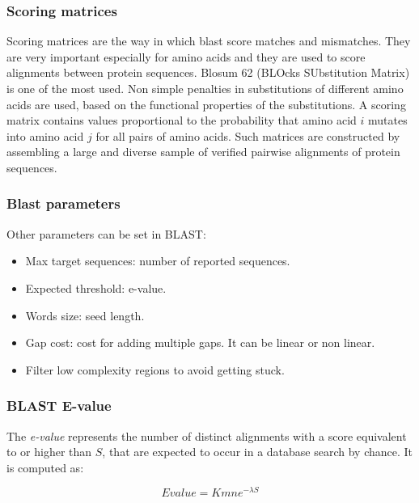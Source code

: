         \subsubsection{Scoring matrices}
        Scoring matrices are the way in which blast score matches and mismatches.
        They are very important especially for amino acids and they are used to score alignments between protein sequences.
        Blosum 62 (BLOcks SUbstitution Matrix) is one of the most used.
        Non simple penalties in substitutions of different amino acids are used, based on the functional properties of the substitutions.
        A scoring matrix contains values proportional to the probability that amino acid $i$ mutates into amino acid $j$ for all pairs of amino acids.
        Such matrices are constructed by assembling a large and diverse sample of verified pairwise alignments of protein sequences.

        \subsubsection{Blast parameters}
        Other parameters can be set in BLAST:

        \begin{multicols}{2}
            \begin{itemize}
                \item Max target sequences: number of reported sequences.
                \item Expected threshold: e-value.
                \item Words size: seed length.
                \item Gap cost: cost for adding multiple gaps.
                    It can be linear or non linear.
                \item Filter low complexity regions to avoid getting stuck.
            \end{itemize}
        \end{multicols}

        \subsubsection{BLAST E-value}
        The \emph{e-value} represents the number of distinct alignments with a score equivalent to or higher than $S$, that are expected to occur in a database search by chance.
        It is computed as:

        $$Evalue = Kmne^{-\lambda S}$$

